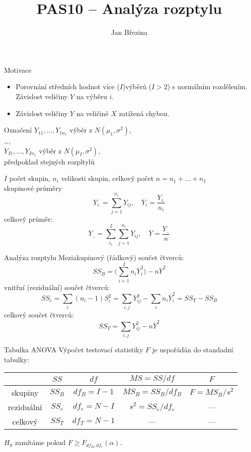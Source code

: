\documentclass[smaller]{beamer}
\title{PAS10 -- Analýza rozptylu}
\author{Jan B\v rezina}
\institute %
{
  Technical University of Liberec
}
\def\ol#1{\overline{#1}}
\def\xskip{{\vspace{2ex}}}
\begin{document}
\begin{frame}
  \titlepage
\end{frame}

\def\df{\usebeamercolor[fg]{my red}\it}

\begin{frame}{Motivace}
  \begin{itemize}
   \item Porovnání středních hodnot více ($I$)výběrů ($I>2$) s normálním rozdělením.\\
         Závislost veličiny $Y$ na výběru $i$.
   \item Závislost veličiny $Y$ na veličině $X$ zatížená chybou.
 
  \end{itemize}

\end{frame}

\begin{frame}{Označení}
 $Y_{11}, \dots, Y_{1n_1}$ výběr z $N(\mu_1, \sigma^2)$,\\
 \dots,\\
 $Y_{I1}, \dots, Y_{In_1}$ výběr z $N(\mu_I, \sigma^2)$,\\
předpoklad stejných rozpltylů

\xskip
$I$ počet skupin, $n_i$ velikosti skupin, celkový počet $n = n_1 + \dots + n_I$\\
skupinové průměry
\[
 Y_{i.} = \sum_{j=1}^{n_i} Y_{ij},\quad \ol{Y}_i = \frac{Y_{i.}}{n_i}
\]
celkový průměr:
\[
 Y_{..} = \sum_{i_1}^{I}\sum_{j=1}^{n_i} Y_{ij},\quad \ol{Y} = \frac{Y_{..}}{n}
\]

\end{frame}


\begin{frame}{Analýza rozptylu}
Meziakupinový (řádkový) součet čtverců:
\[
 SS_B= \Big(\sum_{i=1}^I n_i \ol{Y}_i^2\Big) - n\ol{Y}^2
\]
vnitřní (reziduální) součet čtverců:
\[
 SS_e = \sum_{i} (n_i - 1) S_i^2 = \sum_{i,j} Y_{ij}^2 - \sum_i n_i \ol{Y}_i^2 = SS_T  - SS_B
\]
celkový součet čtverců:
\[
 SS_T = \sum_{i,j} Y_{ij}^2 - n\ol{Y}^2
\]
\end{frame}

\begin{frame}{Tabulka ANOVA}
Výpočet testovací statistiky $F$ je uspořádán do standadní tabulky:

\xskip
\renewcommand*\arraystretch{1.5}
\begin{tabular}{c|c|c|c|c}
 & $SS$ & $df$ & $MS = SS/df$ & $F$ \\
\hline

skupiny & $SS_B$ & $df_B = I-1$ & $MS_B=SS_B / df_B$ & $F = MS_B / s^2$\\
\hline
reziduální &$SS_e$ & $df_e = N-I$ & $s^2 = SS_e / df_e$ &  --- \\
\hline
celkový & $SS_T$ & $df_T = N-1$ & ---  & ---
\end{tabular}

\xskip
$H_0$ zamítáme pokud $F \ge F_{df_B,df_e}(\alpha)$.
\end{frame}
\end{document}
